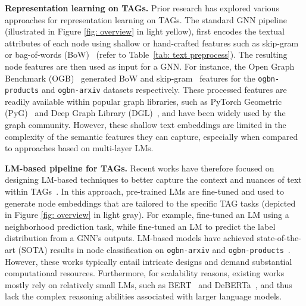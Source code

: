 \documentclass{article}
\begin{document}
\textbf{Representation learning on TAGs.}
Prior research has explored various approaches for representation learning on TAGs. The standard GNN pipeline (illustrated in Figure \ref{fig: overview} in light yellow),  first encodes the textual attributes of each node using shallow or hand-crafted features such as skip-gram~\citep{mikolov2013distributed_skipgram} or bag-of-words (BoW)~\citep{harris1985distributional_bow} (refer to Table~\ref{tab: text preprocess}). The resulting node features are then used as input for a GNN. For instance, the Open Graph Benchmark (OGB)~\citep{hu2020open} generated BoW and skip-gram~\citep{mikolov2013distributed_skipgram} features for the \texttt{ogbn-products} and \texttt{ogbn-arxiv} datasets respectively. These processed features are readily available within popular graph libraries, such as PyTorch Geometric (PyG)~\citep{fey2019fast_pyg} and Deep Graph Library (DGL)~\citep{wang2019deep_dgl}, and have been widely used by the graph community. However, these shallow text embeddings are limited in the complexity of the semantic features they can capture, especially when compared to approaches based on multi-layer LMs.


\textbf{LM-based pipeline for TAGs.} 
Recent works have therefore focused on designing LM-based techniques to better capture the context and nuances of text within TAGs~\citep{chien2021node_giant, zhao2022learning_em, dinh2022e2eg}.
In this approach, pre-trained LMs are fine-tuned and used to generate node embeddings that are tailored to the specific TAG tasks (depicted in Figure \ref{fig: overview} in light gray).
For example, \citet{chien2021node_giant} fine-tuned an LM using a neighborhood prediction task, while \citet{zhao2022learning_em} fine-tuned an LM to predict the label distribution from a GNN's outputs. 
LM-based models have achieved state-of-the-art (SOTA) results in node classification on \texttt{ogbn-arxiv} and \texttt{ogbn-products}~\citep{zhao2022learning_em}. However, these works typically entail intricate designs and demand substantial computational resources.
Furthermore, for scalability reasons, existing works mostly rely on relatively small LMs, such as BERT~\citep{devlin2018bert} and DeBERTa~\citep{he2021deberta}, and thus lack the complex reasoning abilities associated with larger language models.
\end{document}
